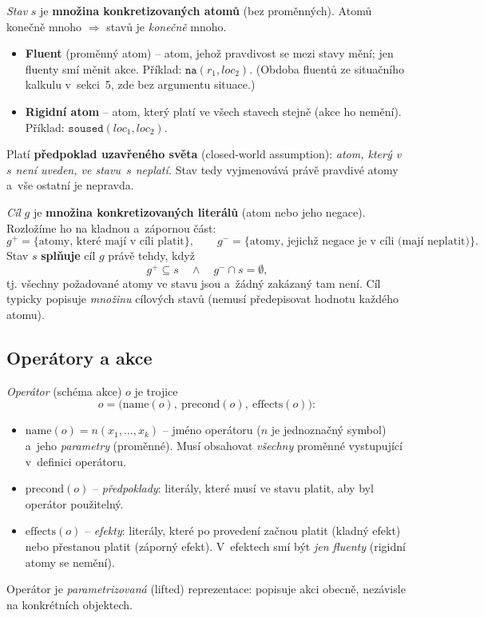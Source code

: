 \begin{definice}
\emph{Stav} $s$ je \textbf{množina konkretizovaných atomů} (bez proměnných). Atomů konečně mnoho $\Rightarrow$ stavů je \emph{konečně} mnoho.
\begin{itemize}
  \item \textbf{Fluent} (proměnný atom) -- atom, jehož pravdivost se mezi stavy mění; jen fluenty smí měnit akce. Příklad: $\mathtt{na}(\mathit{r}_1,\mathit{loc}_2)$. (Obdoba fluentů ze situačního kalkulu v~sekci~5, zde bez argumentu situace.)
  \item \textbf{Rigidní atom} -- atom, který platí ve všech stavech stejně (akce ho nemění). Příklad: $\mathtt{soused}(\mathit{loc}_1,\mathit{loc}_2)$.
\end{itemize}
Platí \textbf{předpoklad uzavřeného světa} (closed-world assumption): \emph{atom, který v~$s$ není uveden, ve stavu~$s$ neplatí.} Stav tedy vyjmenovává právě pravdivé atomy a~vše ostatní je nepravda.
\end{definice}

\begin{definice}
\emph{Cíl} $g$ je \textbf{množina konkretizovaných literálů} (atom nebo jeho negace). Rozložíme ho na kladnou a~zápornou část:
\[ g^{+} = \{\text{atomy, které mají v~cíli platit}\}, \qquad g^{-} = \{\text{atomy, jejichž negace je v~cíli (mají neplatit)}\}. \]
Stav $s$ \textbf{splňuje} cíl $g$ právě tehdy, když
\[ g^{+}\subseteq s \quad\wedge\quad g^{-}\cap s = \emptyset, \]
tj. všechny požadované atomy ve stavu jsou a~žádný zakázaný tam není. Cíl typicky popisuje \emph{množinu} cílových stavů (nemusí předepisovat hodnotu každého atomu).
\end{definice}

\subsection{Operátory a akce}

\begin{definice}[Operátor]
\emph{Operátor} (schéma akce) $o$ je trojice
\[ o = \bigl(\mathrm{name}(o),\ \mathrm{precond}(o),\ \mathrm{effects}(o)\bigr): \]
\begin{itemize}
  \item $\mathrm{name}(o)=n(x_1,\dots,x_k)$ -- jméno operátoru ($n$ je jednoznačný symbol) a~jeho \emph{parametry} (proměnné). Musí obsahovat \emph{všechny} proměnné vystupující v~definici operátoru.
  \item $\mathrm{precond}(o)$ -- \emph{předpoklady}: literály, které musí ve stavu platit, aby byl operátor použitelný.
  \item $\mathrm{effects}(o)$ -- \emph{efekty}: literály, které po provedení začnou platit (kladný efekt) nebo přestanou platit (záporný efekt). V~efektech smí být \emph{jen fluenty} (rigidní atomy se nemění).
\end{itemize}
Operátor je \emph{parametrizovaná} (lifted) reprezentace: popisuje akci obecně, nezávisle na konkrétních objektech.
\end{definice}

